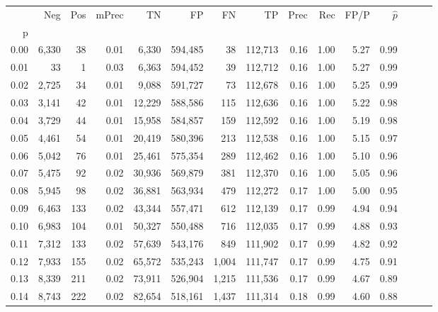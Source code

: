 \begin{tabular}{rrrrrrrrrrrrrrr}
\toprule
{} &     Neg &    Pos & mPrec &       TN &       FP &       FN &       TP &  Prec &   Rec &  FP/P & $\hat{p}$ \\
p    &         &        &       &          &          &          &          &       &       &       &           \\
\midrule
0.00 &   6,330 &     38 &  0.01 &    6,330 &  594,485 &       38 &  112,713 &  0.16 &  1.00 &  5.27 &      0.99 \\
0.01 &      33 &      1 &  0.03 &    6,363 &  594,452 &       39 &  112,712 &  0.16 &  1.00 &  5.27 &      0.99 \\
0.02 &   2,725 &     34 &  0.01 &    9,088 &  591,727 &       73 &  112,678 &  0.16 &  1.00 &  5.25 &      0.99 \\
0.03 &   3,141 &     42 &  0.01 &   12,229 &  588,586 &      115 &  112,636 &  0.16 &  1.00 &  5.22 &      0.98 \\
0.04 &   3,729 &     44 &  0.01 &   15,958 &  584,857 &      159 &  112,592 &  0.16 &  1.00 &  5.19 &      0.98 \\
0.05 &   4,461 &     54 &  0.01 &   20,419 &  580,396 &      213 &  112,538 &  0.16 &  1.00 &  5.15 &      0.97 \\
0.06 &   5,042 &     76 &  0.01 &   25,461 &  575,354 &      289 &  112,462 &  0.16 &  1.00 &  5.10 &      0.96 \\
0.07 &   5,475 &     92 &  0.02 &   30,936 &  569,879 &      381 &  112,370 &  0.16 &  1.00 &  5.05 &      0.96 \\
0.08 &   5,945 &     98 &  0.02 &   36,881 &  563,934 &      479 &  112,272 &  0.17 &  1.00 &  5.00 &      0.95 \\
0.09 &   6,463 &    133 &  0.02 &   43,344 &  557,471 &      612 &  112,139 &  0.17 &  0.99 &  4.94 &      0.94 \\
0.10 &   6,983 &    104 &  0.01 &   50,327 &  550,488 &      716 &  112,035 &  0.17 &  0.99 &  4.88 &      0.93 \\
0.11 &   7,312 &    133 &  0.02 &   57,639 &  543,176 &      849 &  111,902 &  0.17 &  0.99 &  4.82 &      0.92 \\
0.12 &   7,933 &    155 &  0.02 &   65,572 &  535,243 &    1,004 &  111,747 &  0.17 &  0.99 &  4.75 &      0.91 \\
0.13 &   8,339 &    211 &  0.02 &   73,911 &  526,904 &    1,215 &  111,536 &  0.17 &  0.99 &  4.67 &      0.89 \\
0.14 &   8,743 &    222 &  0.02 &   82,654 &  518,161 &    1,437 &  111,314 &  0.18 &  0.99 &  4.60 &      0.88 \\

\end{tabular}
